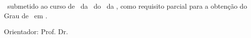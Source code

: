 

\begin{center}


{\ABNTEXchapterfont\large\imprimirautor}
\vspace*{\fill}\vspace*{\fill}



	\vspace*{4 cm}
	\begin{center}
	\ABNTEXchapterfont\bfseries\Large\imprimirtitulo
	\end{center}


	\vspace*{\fill}

	\hspace{.45\textwidth}
    \begin{minipage}{.5\textwidth}

\imprimirtipotrabalho\ submetido ao curso
 de \imprimircurso\ da \imprimirfaculdade\
 do \imprimirinstituto\ da \imprimirinstituicao,
 como requisito parcial para a obtenção do Grau 
 de \imprimirgrauacademico\ em \imprimircurso.

        
        \vspace*{0.7 cm}
        {\large Orientador: Prof. Dr. \imprimirorientador} \par \vspace*{0.5 cm}
    \end{minipage}



\vspace*{\fill}
\large \textsc \imprimirlocal \\
\large \textsc \imprimirdata


\end{center}

